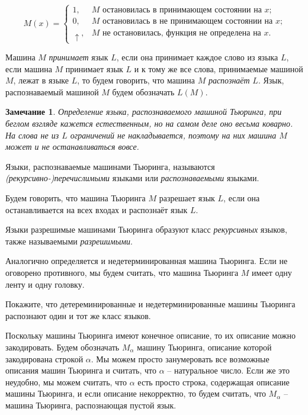 \documentclass[12pt, leqno]{article}
\theoremstyle{definiton}
\newtheorem{Remark}{Замечание}
\theoremstyle{definition}
\theoremstyle{definition}
\newcounter{problem}
\newcounter{uproblem}
\newcounter{subproblem}
\def\upr{\medskip\noindent\stepcounter{uproblem}{\bf Упражнение \theuproblem .  }\setcounter{subproblem}{0} }
\begin{document}
$$
	M(x) = 
	\begin{cases}
		1, & M \text{ остановилась в принимающем состоянии на $x$;} \\
		0, & M \text{ остановилась в не принимающем состоянии на $x$;}\\ 
		\uparrow, & M \text{ не остановилась, функция не определена на $x$.}
	\end{cases}
$$


	 Машина $M$ \emph{принимает} язык $L$, если она принимает каждое слово из языка $L$, если машина $M$ принимает язык $L$ и к тому же все слова, принимаемые машиной $M$, лежат в языке $L$,  то будем говорить, что машина $M$ \emph{распознаёт} $L$. Язык, распознаваемый машиной $M$ будем обозначать $L(M)$.


\begin{Remark}
	Определение языка, распознаваемого машиной Тьюринга, при беглом взгляде кажется естественным, но на самом деле оно весьма коварно. На слова не из $L$ ограничений не накладывается, поэтому на них машина $M$ может и не останавливаться вовсе.
\end{Remark}

Языки, распознаваемые машинами Тьюринга, называются \emph{(рекурсивно-)перечислимыми} языками или \emph{распознаваемыми} языками.

Будем говорить, что машина Тьюринга $M$ разрешает язык $L$, если она останавливается на всех входах и распознаёт язык $L$.

Языки разрешимые машинами Тьюринга образуют класс \emph{рекурсивных} языков, также называемыми \emph{разрешимыми}.
 

Аналогично определяется и недетерминированная машина Тьюринга.
Если не оговорено противного, мы будем считать, что машина Тьюринга $M$ имеет одну ленту и одну головку.

\bigskip

\upr Покажите, что детереминированные и недетерминированные машины Тьюринга распознают один и тот же класс языков. 

\bigskip


Поскольку машины Тьюринга имеют конечное описание, то их описание можно закодировать. Будем обозначать $M_\alpha$ машину Тьюринга, описание которой закодирована строкой $\alpha$. Мы можем просто занумеровать все возможные описания машин Тьюринга и считать, что $\alpha$ -- натуральное число. Если же это неудобно, мы можем считать, что $\alpha$ есть просто строка, содержащая описание машины Тьюринга, и если описание некорректно, то будем считать, что $M_\alpha$ -- машина Тьюринга, распознающая пустой язык.
\end{document}
